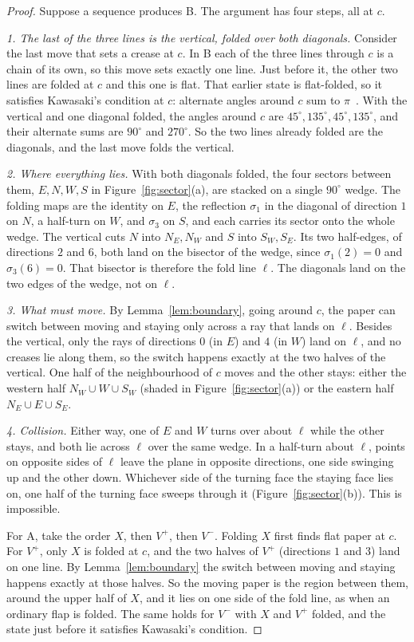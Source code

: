 \documentclass[11pt]{article}
\theoremstyle{definition}
\theoremstyle{remark}
\begin{document}
\begin{proof}
Suppose a sequence produces B. The argument has four steps, all at $c$.

\emph{1. The last of the three lines is the vertical, folded over both diagonals.} Consider the last move that sets a crease at $c$. In B each of the three lines through $c$ is a chain of its own, so this move sets exactly one line. Just before it, the other two lines are folded at $c$ and this one is flat. That earlier state is flat-folded, so it satisfies Kawasaki's condition at $c$: alternate angles around $c$ sum to $\pi$~\cite{hull}. With the vertical and one diagonal folded, the angles around $c$ are $45^\circ,135^\circ,45^\circ,135^\circ$, and their alternate sums are $90^\circ$ and $270^\circ$. So the two lines already folded are the diagonals, and the last move folds the vertical.

\emph{2. Where everything lies.} With both diagonals folded, the four sectors between them, $E,N,W,S$ in Figure~\ref{fig:sector}(a), are stacked on a single $90^\circ$ wedge. The folding maps are the identity on $E$, the reflection $\sigma_1$ in the diagonal of direction $1$ on $N$, a half-turn on $W$, and $\sigma_3$ on $S$, and each carries its sector onto the whole wedge. The vertical cuts $N$ into $N_E,N_W$ and $S$ into $S_W,S_E$. Its two half-edges, of directions $2$ and $6$, both land on the bisector of the wedge, since $\sigma_1(2)=0$ and $\sigma_3(6)=0$. That bisector is therefore the fold line $\ell$. The diagonals land on the two edges of the wedge, not on $\ell$.

\emph{3. What must move.} By Lemma~\ref{lem:boundary}, going around $c$, the paper can switch between moving and staying only across a ray that lands on $\ell$. Besides the vertical, only the rays of directions $0$ (in $E$) and $4$ (in $W$) land on $\ell$, and no creases lie along them, so the switch happens exactly at the two halves of the vertical. One half of the neighbourhood of $c$ moves and the other stays: either the western half $N_W\cup W\cup S_W$ (shaded in Figure~\ref{fig:sector}(a)) or the eastern half $N_E\cup E\cup S_E$.

\emph{4. Collision.} Either way, one of $E$ and $W$ turns over about $\ell$ while the other stays, and both lie across $\ell$ over the same wedge. In a half-turn about $\ell$, points on opposite sides of $\ell$ leave the plane in opposite directions, one side swinging up and the other down. Whichever side of the turning face the staying face lies on, one half of the turning face sweeps through it (Figure~\ref{fig:sector}(b)). This is impossible.

For A, take the order $X$, then $V^+$, then $V^-$. Folding $X$ first finds flat paper at $c$. For $V^+$, only $X$ is folded at $c$, and the two halves of $V^+$ (directions $1$ and $3$) land on one line. By Lemma~\ref{lem:boundary} the switch between moving and staying happens exactly at those halves. So the moving paper is the region between them, around the upper half of $X$, and it lies on one side of the fold line, as when an ordinary flap is folded. The same holds for $V^-$ with $X$ and $V^+$ folded, and the state just before it satisfies Kawasaki's condition.
\end{proof}
\end{document}
